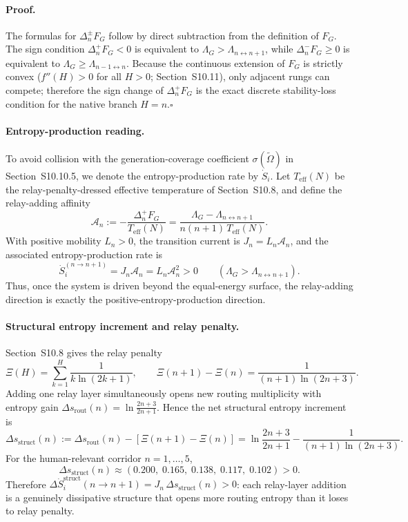 \documentclass[11pt]{article}
\begin{document}
\paragraph{Proof.}
The formulas for $\Delta_n^\pm F_G$ follow by direct subtraction from the
definition of $F_G$.
The sign condition
$\Delta_n^+F_G<0$ is equivalent to
$\Lambda_G>\Lambda_{n\leftrightarrow n+1}$,
while
$\Delta_n^-F_G\ge0$ is equivalent to
$\Lambda_G\ge\Lambda_{n-1\leftrightarrow n}$.
Because the continuous extension of $F_G$ is strictly convex
($f''(H)>0$ for all $H>0$; Section~S10.11), only adjacent
rungs can compete; therefore the sign change of $\Delta_n^+F_G$ is the exact
discrete stability-loss condition for the native branch $H=n$.\hfill$\square$

\paragraph{Entropy-production reading.}
To avoid collision with the generation-coverage coefficient
$\sigma(\tilde\Omega)$ in Section~S10.10.5, we denote the entropy-production
rate by $\dot{S}_i$.
Let $T_{\mathrm{eff}}(N)$ be the relay-penalty-dressed effective temperature
of Section~S10.8, and define the relay-adding affinity
\[
\mathcal{A}_n:=-\frac{\Delta_n^+F_G}{T_{\mathrm{eff}}(N)}
  =\frac{\Lambda_G-\Lambda_{n\leftrightarrow n+1}}{n(n+1)\,T_{\mathrm{eff}}(N)}.
\]
With positive mobility $L_n>0$, the transition current is
$J_n=L_n\mathcal{A}_n$,
and the associated entropy-production rate is
\[
\dot{S}_i^{(n\to n+1)}=J_n\mathcal{A}_n=L_n\mathcal{A}_n^2>0
  \qquad(\Lambda_G>\Lambda_{n\leftrightarrow n+1}).
\]
Thus, once the system is driven beyond the equal-energy surface, the
relay-adding direction is exactly the positive-entropy-production direction.

\paragraph{Structural entropy increment and relay penalty.}
Section~S10.8 gives the relay penalty
\[
\Xi(H)=\sum_{k=1}^{H}\frac{1}{k\ln(2k+1)},\qquad
\Xi(n{+}1)-\Xi(n)=\frac{1}{(n{+}1)\ln(2n{+}3)}.
\]
Adding one relay layer simultaneously opens new routing multiplicity with
entropy gain
$\Delta s_{\mathrm{rout}}(n)=\ln\!\frac{2n+3}{2n+1}$.
Hence the net structural entropy increment is
\[
\Delta s_{\mathrm{struct}}(n)
  :=\Delta s_{\mathrm{rout}}(n)-[\Xi(n{+}1)-\Xi(n)]
  =\ln\frac{2n+3}{2n+1}-\frac{1}{(n{+}1)\ln(2n{+}3)}.
\]
For the human-relevant corridor $n=1,\dots,5$,
\[
\Delta s_{\mathrm{struct}}(n)\approx(0.200,\;0.165,\;0.138,\;0.117,\;0.102)>0.
\]
Therefore
$\Delta\dot{S}_i^{\mathrm{struct}}(n\to n+1)=J_n\,\Delta s_{\mathrm{struct}}(n)>0$:
each relay-layer addition is a genuinely dissipative structure that opens more
routing entropy than it loses to relay penalty.
\end{document}
